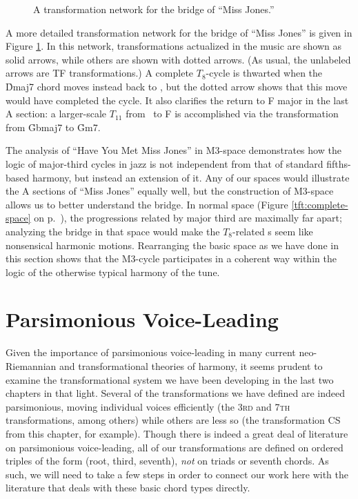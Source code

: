 \begin{figure}[tbp]
  \caption{A transformation network for the bridge of ``Miss Jones.''}
\label{maj3:miss-jones-bridge}
\end{figure}

A more detailed transformation network for the bridge of ``Miss Jones'' is
given in Figure \ref{maj3:miss-jones-bridge}. In this network,
transformations actualized in the music are shown as solid arrows, while
others are shown with dotted arrows. (As usual, the unlabeled arrows are TF
transformations.) A complete $T_8$-cycle is thwarted when the \h{Dmaj7} chord
moves instead back to \Gflat, but the dotted arrow shows that this move would
have completed the cycle. It also clarifies the return to F major in the last
A section: a larger-scale $T_{11}$ from \Gflat\ to F is accomplished via the
\slideS transformation from \h{Gbmaj7} to \h{Gm7}.

The analysis of ``Have You Met Miss Jones'' in M3-space demonstrates how the
logic of major-third cycles in jazz is not independent from that of standard
fifths-based harmony, but instead an extension of it. Any of our spaces would
illustrate the A sections of ``Miss Jones'' equally well, but the construction
of M3-space allows us to better understand the bridge. In normal \tf space
(Figure \ref{tft:complete-space} on p.~\pageref{tft:complete-space}), the \tfo
progressions related by major third are maximally far apart; analyzing the
bridge in that space would make the $T_8$-related \tfo{}s seem like
nonsensical harmonic motions. Rearranging the basic space as we have done in
this section shows that the M3-cycle participates in a coherent way within the
logic of the otherwise typical harmony of the tune.

\section{Parsimonious Voice-Leading}
\label{sec:parsimony}

Given the importance of parsimonious voice-leading in many current
neo-Riemannian and transformational theories of harmony, it seems prudent to
examine the transformational system we have been developing in the last two
chapters in that light. Several of the transformations we have defined are
indeed parsimonious, moving individual voices efficiently (the \textsc{3rd}
and \textsc{7th} transformations, among others) while others are less so (the
transformation CS from this chapter, for example). Though there is indeed a
great deal of literature on parsimonious voice-leading, all of our
transformations are defined on ordered triples of the form (root, third,
seventh), \emph{not} on triads or seventh chords. As such, we will need to
take a few steps in order to connect our work here with the literature that
deals with these basic chord types directly.

